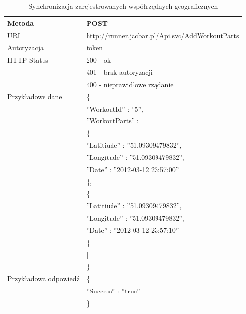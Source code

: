 \begin{table}
 \label{workoutpart}
  \caption{Synchronizacja zarejestrowanych współrzędnych geograficznych}
  \begin{center}
  \begin{tabular}{| l | l |}
  	\hline
  	Metoda & POST \\ \hline
  	URI & http://runner.jacbar.pl/Api.svc/AddWorkoutParts \\ \hline
  	Autoryzacja & token\\ \hline
  	HTTP Status & 200 - ok \\
                & 401 - brak autoryzacji \\
                & 400 - nieprawidłowe rządanie \\ \hline
    Przykładowe dane & \{ \\
    								 & \quad ''WorkoutId'' : ''5'', \\
    								 & \quad ''WorkoutParts'' : [ \\
    								 & \qquad \{ \\
    								 & \quad \qquad ''Latitiude'' : ''51.09309479832'', \\
    								 & \quad \qquad ''Longitude'' : ''51.09309479832'', \\
    								 & \quad \qquad ''Date'' : ''2012-03-12 23:57:00'' \\
    								 & \qquad \}, \\    								 & \qquad \{ \\
    								 & \quad \qquad ''Latitiude'' : ''51.09309479832'', \\
    								 & \quad \qquad ''Longitude'' : ''51.09309479832'', \\
    								 & \quad \qquad ''Date'' : ''2012-03-12 23:57:10'' \\
    								 & \qquad \} \\
    								 & \quad ] \\
    								 & \} \\ \hline
    Przykładowa odpowiedź & \{ \\
                          & \quad ''Success'' : ''true'' \\
                          & \} \\ \hline
  \end{tabular}
  \end{center}
\end{table}


